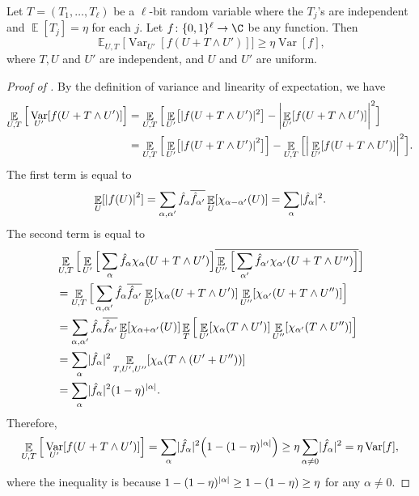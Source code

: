 \documentclass{toc}
\newcommand{\zo}{\{0,1\}}
\def\Blocklength{\ell}
\def\hf{\hat f}
\DeclarePairedDelimiter{\abs}{\lvert}{\rvert}
\DeclareMathOperator*{\E}{\mathbb{E}}                 %
\DeclareMathOperator*{\Var}{Var}                 %
\begin{document}
  \begin{claim} \label{claim-der-var-noise}
    Let $T = (T_1, \ldots, T_\Blocklength)$ be a 
    $\ell$-bit  %
    random variable 
    where the $T_j$'s are independent and $\E[T_j] = \eta$ for each $j$.
    Let $f\colon \zo^\Blocklength \to \C$ be any function.
    Then
    \[
      \E_{U,T} \Big[ \Var_{U'}[f(U + T \wedge U')] \Big]
      \ge \eta \Var[f] ,
    \]
    where 
    $T,U$ and $U'$ are independent, and $U$ and $U'$ are uniform.
  \end{claim}
  \begin{proof}[Proof of {}]
    By the definition of variance and linearity of expectation, we have
    \begin{align*}
      \E_{U,T} \Big[ \Var_{U'}[f(U + T \wedge U')] \Big]
      &= \E_{U,T} \Big[ \E_{U'} \bigl[ \abs{f(U + T \wedge U')}^2 \bigr] - \abs*{ \E_{U'}[f(U + T \wedge U')] }^2 \Big] \\
      &= \E_{U,T} \Big[ \E_{U'} \bigl[ \abs*{f(U + T \wedge U')}^2 \bigr] \Big] - \E_{U,T} \Big[ \Big| \E_{U'}[f(U + T \wedge U')] \Big|^2 \Big] .
    \end{align*}
    The first term is equal to
    \[
      \E_U[ \abs*{f(U)}^2 ]
      = \sum_{\alpha, \alpha'} \hf_\alpha \overline{\hf_{\alpha'}} \E_{U}[ \chi_{\alpha - \alpha'}(U) ]
      = \sum_{\alpha} \abs{\hf_\alpha}^2 .
    \]
    The second term is equal to
    \begin{align*}
      &\E_{U,T} \Big[ \E_{U'} \Big[ \sum_\alpha \hf_\alpha \chi_\alpha(U + T \wedge U') \Big] \overline{ \E_{U''} \Big[ \sum_{\alpha'} \hf_{\alpha'} \chi_{\alpha'}(U + T \wedge U'') \Big]} \Big] \\
      &= \E_{U,T} \Big[ \sum_{\alpha, \alpha'} \hf_\alpha \overline{\hf_{\alpha'}} \E_{U'}[ \chi_{\alpha}(U + T \wedge U') ] \E_{U''}[ \chi_{\alpha'}(U + T \wedge U'') ] \Big] \\
      &= \sum_{\alpha, \alpha'} \hf_\alpha \overline{\hf_{\alpha'}} \E_{U}[ \chi_{\alpha + \alpha'}(U) ] \E_T \Big[ \E_{U'}[ \chi_\alpha(T \wedge U') ] \E_{U''}[ \chi_{\alpha'}(T \wedge U'') ] \Big] \\
      &= \sum_{\alpha} \abs{\hf_\alpha}^2 \E_{T,U',U''} [ \chi_{\alpha}(T \wedge (U' + U'')) ] \\
      &= \sum_{\alpha} \abs{\hf_\alpha}^2 (1 - \eta)^{\abs{\alpha}} .
    \end{align*}
    Therefore,
    \begin{align*}
      \E_{U,T} \Big[ \Var_{U'}[f(U + T \wedge U')] \Big]
      = \sum_\alpha \abs{\hf_\alpha}^2 \Big(1 - (1 - \eta)^{\abs{\alpha}} \Big)
      \ge \eta \sum_{\alpha \neq 0} \abs{\hf_\alpha}^2
      = \eta \Var[f],
    \end{align*}
    where the inequality is because $1 - (1 - \eta)^{\abs{\alpha}} \ge 1
    - (1 - \eta) \ge \eta$ for any $\alpha \neq 0$.
  \end{proof}
\end{document}
